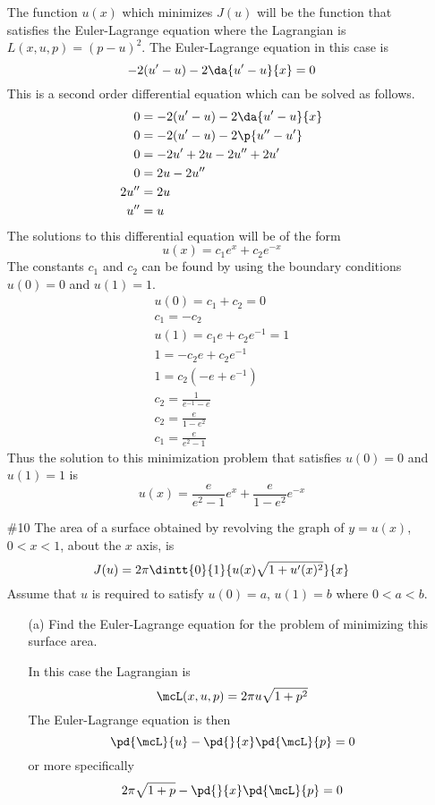 \documentclass[11pt, oneside]{article}
\begin{document}
\begin{enumerate}
    The function $u(x)$ which minimizes $J(u)$ will be the function that
    satisfies the Euler-Lagrange equation where the Lagrangian is
    $L(x, u, p) = (p - u)^2$.
    The Euler-Lagrange equation in this case is
    \[
      -2(u' - u) - 2\da{u' - u}{x} = 0
    \]
    This is a second order differential equation which can be solved as follows.
    \begin{align*}
      0 &= -2(u' - u) - 2\da{u' - u}{x} \\
      0 &= -2(u' - u) - 2\p{u'' - u'} \\
      0 &= -2u' + 2u - 2u'' + 2u' \\
      0 &= 2u - 2u'' \\
      2u'' &= 2u \\
      u'' &= u \\
    \end{align*}
    The solutions to this differential equation will be of the form
    \[
      u(x) = c_1 e^x + c_2 e^{-x}
    \]
    The constants $c_1$ and $c_2$ can be found by using the boundary conditions
    $u(0) = 0$ and $u(1) = 1$.
    \begin{align*}
      u(0) = c_1 + c_2 = 0 \\
      c_1 = -c_2 \\
      u(1) = c_1 e + c_2 e^{-1} = 1\\
      1 = -c_2 e + c_2 e^{-1} \\
      1 = c_2(-e + e^{-1}) \\
      c_2 = \frac{1}{e^{-1} - e} \\
      c_2 = \frac{e}{1 - e^2} \\
      c_1 = \frac{e}{e^2 - 1}
    \end{align*}
    Thus the solution to this minimization problem that satisfies $u(0) = 0$ and
    $u(1) = 1$ is
    \[
      u(x) = \frac{e}{e^2 - 1} e^x + \frac{e}{1 - e^2} e^{-x}
    \]

  \pagebreak
  \item[\#10]
    The area of a surface obtained by revolving the graph of $y = u(x)$,
    $0 < x < 1$, about the $x$ axis, is
    \[
      J(u) = 2\pi \dintt{0}{1}{u(x) \sqrt{1 + u'(x)^2}}{x}
    \]
    Assume that $u$ is required to satisfy $u(0) = a$, $u(1) = b$ where
    $0 < a < b$.
    \begin{enumerate}
      \item[(a)]
        Find the Euler-Lagrange equation for the problem of minimizing this surface area.

        In this case the Lagrangian is
        \[
          \mcL(x, u, p) = 2\pi u \sqrt{1 + p^2}
        \]
        The Euler-Lagrange equation is then
        \[
          \pd{\mcL}{u} - \pd{}{x} \pd{\mcL}{p} = 0
        \]
        or more specifically
        \[
          2\pi \sqrt{1 + p} - \pd{}{x} \pd{\mcL}{p} = 0
        \]


\end{enumerate}
\end{enumerate}
\end{document}
